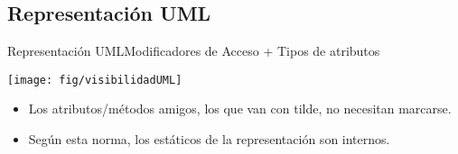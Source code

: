 \documentclass[10pt,envcountsect,spanish]{beamer}
\begin{document}






\subsection{Representación UML}



\begin{frame}{Representación UML}{Modificadores de Acceso + Tipos de atributos}
\centerline{\texttt{[image: fig/visibilidadUML]}}
%
%
%
%
%
%
%
%
%
%
\begin{itemize}
\item Los atributos/métodos amigos, los que van con tilde, no necesitan marcarse.
\item Según esta norma, los estáticos de la representación son internos.
\end{itemize}

\end{frame}
\end{document}
